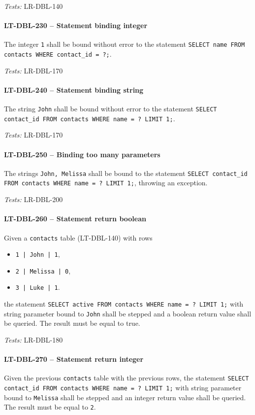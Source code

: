 \textit{Tests: } LR-DBL-140

\paragraph{LT-DBL-230 -- Statement binding integer}
The integer \lstinline{1} shall be bound without error to the statement
\lstinline{SELECT name FROM contacts WHERE contact_id = ?;}.

\textit{Tests: } LR-DBL-170

\paragraph{LT-DBL-240 -- Statement binding string}
The string \lstinline{John} shall be bound without error to the statement
\lstinline{SELECT contact_id FROM contacts WHERE name = ? LIMIT 1;}.

\textit{Tests: } LR-DBL-170

\paragraph{LT-DBL-250 -- Binding too many parameters}
The strings \lstinline{John, Melissa} shall be bound to the statement
\lstinline{SELECT contact_id FROM contacts WHERE name = ? LIMIT 1;},
throwing an exception.

\textit{Tests: } LR-DBL-200

\paragraph{LT-DBL-260 -- Statement return boolean}
Given a \lstinline{contacts} table (LT-DBL-140)
with rows
\begin{itemize}
\item \lstinline{1 | John | 1},
\item \lstinline{2 | Melissa | 0},
\item \lstinline{3 | Luke | 1}.
\end{itemize}
the statement \lstinline{SELECT active FROM contacts WHERE name = ? LIMIT 1;}
with string parameter bound to \lstinline{John} shall be stepped and
a boolean return value shall be queried. The result must be equal to true.

\textit{Tests: } LR-DBL-180

\paragraph{LT-DBL-270 -- Statement return integer}
Given the previous \lstinline{contacts} table with the previous rows,
the statement
\lstinline{SELECT contact_id FROM contacts WHERE name = ? LIMIT 1;}
with string parameter bound to \lstinline{Melissa} shall be stepped
and an integer return value shall be queried. The result must be
equal to \lstinline{2}.

